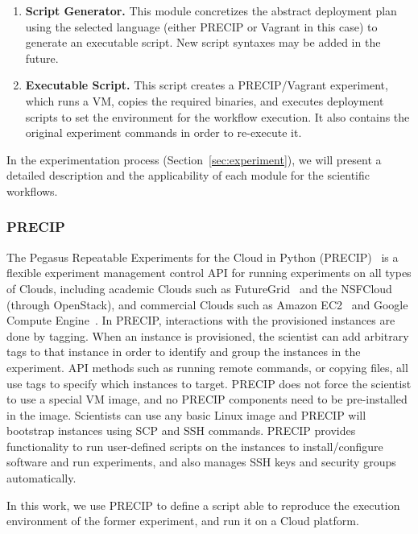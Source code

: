 \begin{enumerate}
	\item \textbf{Script Generator.} This module concretizes the abstract deployment plan using the selected
		language (either PRECIP or Vagrant in this case) to generate an executable script. New script syntaxes 
		may be added in the future.

	\item \textbf{Executable Script.} This script creates a PRECIP/Vagrant experiment, which runs a VM, 
		copies the required binaries, and executes deployment scripts to set the environment for the 
		workflow execution. It also contains the original experiment commands in order to 
		re-execute it.

\end{enumerate}

In the experimentation process (Section~\ref{sec:experiment}), we will present a detailed description 
and the applicability of each module for the  scientific workflows.



\subsubsection{PRECIP}
The Pegasus Repeatable Experiments for the Cloud in Python (PRECIP)~\cite{Azarnoosh-CRC-2013} 
is a flexible experiment management control API for running experiments on all types of Clouds, 
including academic Clouds such as FutureGrid~\cite{futuregrid} and the NSFCloud~\cite{chameleon,cloudlab}
(through OpenStack), and commercial Clouds such as Amazon EC2~\cite{aws} and Google 
Compute Engine~\cite{gce}. In PRECIP, interactions with the provisioned instances are done by 
tagging. When an instance is provisioned, the scientist can add arbitrary tags to that instance in 
order to identify and group the instances in the experiment. API methods such as running remote 
commands, or copying files, all use tags to specify which instances to target. PRECIP does not 
force the scientist to use a special VM image, and no PRECIP components need to be pre-installed 
in the image. Scientists can use any basic Linux image and PRECIP will bootstrap instances using 
SCP and SSH commands. PRECIP provides functionality to run user-defined scripts on the instances 
to install/configure software and run experiments, and also manages SSH keys and security groups 
automatically.

In this work, we use PRECIP to define a script able to reproduce the execution environment of the 
former experiment, and run it on a Cloud platform.


